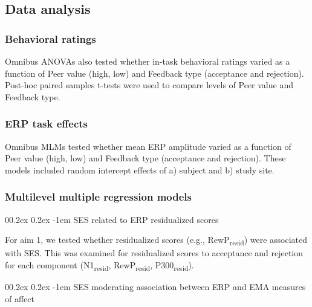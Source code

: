 \documentclass[
  man]{apa7}
\makeatletter
\let\oldparagraph\paragraph
\renewcommand{\paragraph}[1]{\oldparagraph{#1}\mbox{}}
\renewcommand{\paragraph}{\@startsection{paragraph}{4}{\parindent}%
  {0\baselineskip \@plus 0.2ex \@minus 0.2ex}%
  {-1em}%
  {\normalfont\normalsize\bfseries\itshape\typesectitle}}
\makeatother
\begin{document}
\hypertarget{data-analysis}{%
\subsection{Data analysis}\label{data-analysis}}

\hypertarget{behavioral-ratings}{%
\subsubsection{Behavioral ratings}\label{behavioral-ratings}}

Omnibus ANOVAs also tested whether in-task behavioral ratings varied as a function of Peer value (high, low) and Feedback type (acceptance and rejection). Post-hoc paired samples t-tests were used to compare levels of Peer value and Feedback type.

\hypertarget{erp-task-effects}{%
\subsubsection{ERP task effects}\label{erp-task-effects}}

Omnibus MLMs tested whether mean ERP amplitude varied as a function of Peer value (high, low) and Feedback type (acceptance and rejection). These models included random intercept effects of a) subject and b) study site.

\hypertarget{multilevel-multiple-regression-models}{%
\subsubsection{Multilevel multiple regression models}\label{multilevel-multiple-regression-models}}

\hypertarget{ses-related-to-erp-residualized-scores}{%
\paragraph{SES related to ERP residualized scores}\label{ses-related-to-erp-residualized-scores}}

For aim 1, we tested whether residualized scores (e.g., RewP\textsubscript{resid}) were associated with SES. This was examined for residualized scores to acceptance and rejection for each component (N1\textsubscript{resid}, RewP\textsubscript{resid}, P300\textsubscript{resid}).

\hypertarget{ses-moderating-association-between-erp-and-ema-measures-of-affect}{%
\paragraph{SES moderating association between ERP and EMA measures of affect}\label{ses-moderating-association-between-erp-and-ema-measures-of-affect}}
\end{document}
